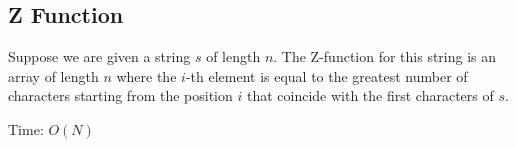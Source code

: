\subsection{Z Function}

Suppose we are given a string $s$ of length $n$. The Z-function for this string is an array of length $n$ where the $i$-th element is equal to the greatest number of characters starting from the position $i$ that coincide with the first characters of $s$.

Time: $O(N)$

